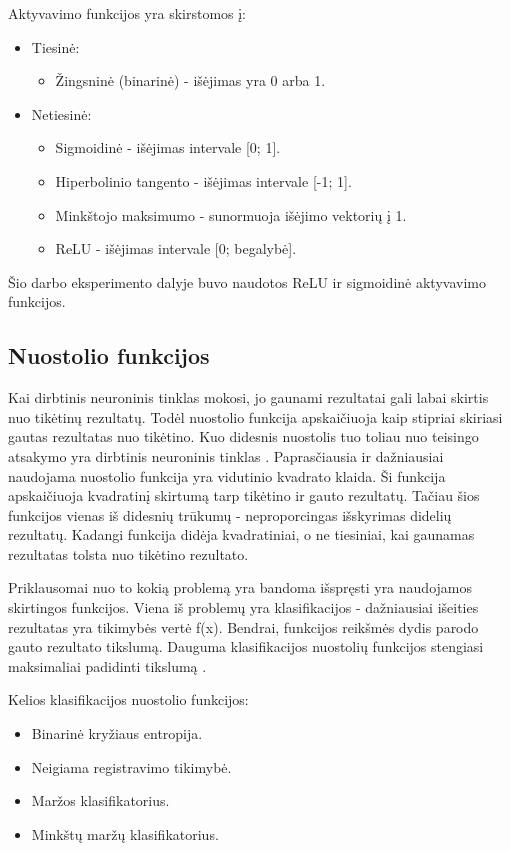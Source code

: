 \documentclass{VUMIFPSkursinis}
\begin{document}
Aktyvavimo funkcijos yra skirstomos į:
\begin{itemize}
\item Tiesinė: 
\begin{itemize}
\item Žingsninė (binarinė) - išėjimas yra 0 arba 1.
\end{itemize}
\item Netiesinė: 
\begin{itemize}
\item Sigmoidinė - išėjimas intervale [0; 1].
\item Hiperbolinio tangento - išėjimas intervale [-1; 1].
\item Minkštojo maksimumo - sunormuoja išėjimo vektorių į 1.
\item ReLU - išėjimas intervale [0; begalybė].
\end{itemize}
\end{itemize}

Šio darbo eksperimento dalyje buvo naudotos ReLU ir sigmoidinė aktyvavimo funkcijos.

\subsection{Nuostolio funkcijos}
Kai dirbtinis neuroninis tinklas mokosi, jo gaunami rezultatai gali labai skirtis nuo tikėtinų rezultatų. Todėl nuostolio funkcija apskaičiuoja kaip stipriai
skiriasi gautas rezultatas nuo tikėtino. Kuo didesnis nuostolis tuo toliau nuo teisingo atsakymo yra dirbtinis neuroninis tinklas \cite{Cameron-loss-fun}.
Paprasčiausia ir dažniausiai naudojama nuostolio funkcija yra vidutinio kvadrato klaida. Ši funkcija apskaičiuoja kvadratinį skirtumą tarp tikėtino 
ir gauto rezultatų. Tačiau šios funkcijos vienas iš didesnių trūkumų - neproporcingas išskyrimas didelių rezultatų. Kadangi funkcija didėja kvadratiniai,
o ne tiesiniai, kai gaunamas rezultatas tolsta nuo tikėtino rezultato.

Priklausomai nuo to kokią problemą yra bandoma išspręsti yra naudojamos skirtingos funkcijos. Viena iš problemų yra klasifikacijos - dažniausiai išeities
rezultatas yra tikimybės vertė f(x). Bendrai, funkcijos reikšmės dydis parodo gauto rezultato tikslumą. Dauguma klasifikacijos nuostolių funkcijos stengiasi
maksimaliai padidinti tikslumą \cite{clas-loss-2017}. 


Kelios klasifikacijos nuostolio funkcijos:
\begin{itemize}
\item Binarinė kryžiaus entropija.
\item Neigiama registravimo tikimybė.
\item Maržos klasifikatorius.
\item Minkštų maržų klasifikatorius.
\end{itemize}
\end{document}
